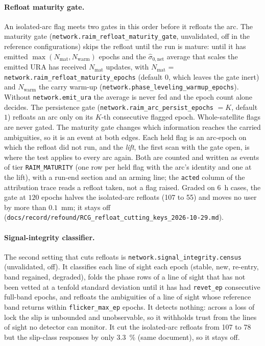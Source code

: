 \documentclass[main.tex]{subfiles}
\begin{document}
\paragraph{Refloat maturity gate.}
An isolated-arc flag meets two gates in this order before it refloats the arc.
The maturity gate (\texttt{network.raim\_refloat\_maturity\_gate}, unvalidated,
off in the reference configurations) skips the refloat until the run is mature:
until it has emitted
$\max(N_{\mathrm{mat}},N_{\mathrm{warm}})$ epochs and the
$\hat\sigma_{0,\mathrm{net}}$ average that scales the emitted URA has received $N_{\mathrm{mat}}$
updates, with $N_{\mathrm{mat}}$ = \texttt{network.raim\_refloat\_maturity\_epochs}
(default $0$, which leaves the gate inert) and $N_{\mathrm{warm}}$ the carry
warm-up (\texttt{network.phase\_leveling\_warmup\_epochs}).  Without
\texttt{network.emit\_ura} the average is never fed and the epoch count alone
decides.  The persistence gate (\texttt{network.raim\_arc\_persist\_epochs} $=K$,
default $1$) refloats an arc only on its $K$-th consecutive flagged epoch.
Whole-satellite flags are never gated.  The maturity gate changes which
information reaches the carried ambiguities, so it is an event at both
edges.  Each held flag is an arc-epoch on which the refloat did not run, and
the \emph{lift}, the first scan with the gate open, is where the test applies to
every arc again.  Both are counted and written as events of tier
\texttt{RAIM\_MATURITY} (one row per held flag with the arc's identity and one at
the lift), with a run-end section and an arming line; the \texttt{acted} column
of the attribution trace reads a refloat taken, not a flag raised.  Graded on
6~h cases, the gate at $120$ epochs halves the isolated-arc refloats (107 to
55) and moves no user by more than $0.1$~mm; it stays off
(\texttt{docs/record/refound/RCG\_refloat\_cutting\_keys\_2026-10-29.md}).

\paragraph{Signal-integrity classifier.}
The second setting that cuts refloats is \texttt{network.signal\_integrity.census}
(unvalidated, off).  It classifies each line of sight each epoch (stable, new,
re-entry, band regained, degraded), folds the phase rows of a line of sight
that has not been vetted at a tenfold standard deviation until it has had
\texttt{revet\_ep} consecutive full-band epochs, and refloats the ambiguities
of a line of sight whose reference band returns within \texttt{flicker\_max\_ep}
epochs.  It detects nothing: across a loss of lock the slip is unbounded and
unobservable, so it withholds trust from the lines of sight no detector can
monitor.  It cut the isolated-arc refloats from 107 to 78 but the slip-class
responses by only 3.3~\% (same document), so it stays off.
\end{document}
